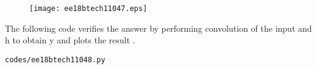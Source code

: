 \begin{enumerate}[label=\thesubsection.\arabic*.,ref=\thesubsection.\theenumi]
\begin{figure}[!ht]
\centering
  \texttt{[image: ee18btech11047.eps]}
  \caption{}
  \label{fig:ee18btech11048}
\end{figure}


The following code verifies the answer by performing convolution of the input and h to obtain y and plots the result .
\begin{lstlisting}
codes/ee18btech11048.py
\end{lstlisting}

\end{enumerate}
